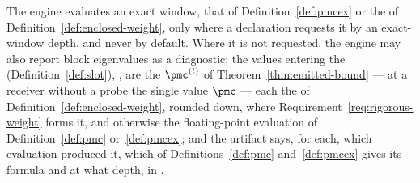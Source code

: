 
\begin{requirement}
\label{req:weight-provenance}
The engine evaluates an exact window, that of Definition~\ref{def:pmcex} or
the  of Definition~\ref{def:enclosed-weight}, only
where a declaration requests it by an exact-window depth, and never by
default. Where it is not requested, the engine may also report block
eigenvalues as a diagnostic; the values entering the 
(Definition~\ref{def:slot}), , are the
 $\pmc^{(t)}$ of
Theorem~\ref{thm:emitted-bound} --- at a receiver without a probe the single
value $\pmc$ --- each the  of
Definition~\ref{def:enclosed-weight}, rounded down, where
Requirement~\ref{req:rigorous-weight} forms it, and otherwise the
floating-point evaluation of Definition~\ref{def:pmc} or~\ref{def:pmcex}; and
the artifact says, for each, which evaluation produced it, which of
Definitions~\ref{def:pmc} and~\ref{def:pmcex} gives its formula and at what
depth, in .
\end{requirement}
